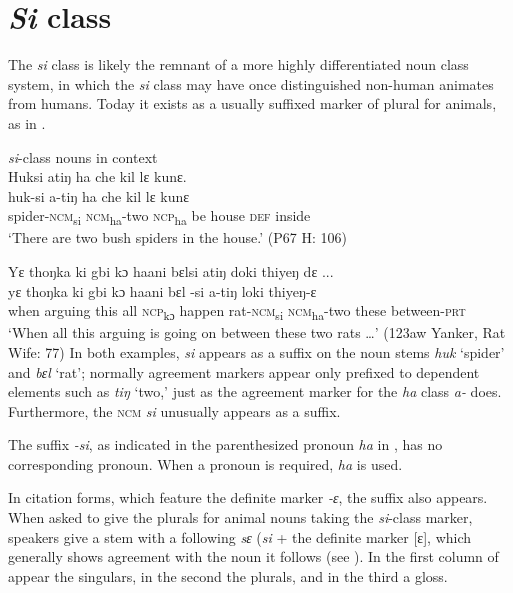 \section{\textit{Si} class}
\hypertarget{Toc115517792}{}\label{sec:5.5}
The \textit{si} class is likely the remnant of a more highly differentiated noun class system, in which the \textit{si} class may have once distinguished non-human animates from humans. Today it exists as a usually suffixed marker of plural for animals, as in .

\ea%
    \label{ex:144}
    \textit{si}{}-class nouns in context\\
    \ea Huksi atiŋ ha che kil lɛ kunɛ.\\
    \gll huk-si      a-tiŋ      ha      che  kil      lɛ    kunɛ\\
    spider-\textsc{ncm}\textsubscript{si}  \textsc{ncm}\textsubscript{ha}{}-two  \textsc{ncp}\textsubscript{ha}    be    house    \textsc{def}  inside\\
    \glt ‘There are two bush spiders in the house.' (P67 H: 106)

    \ex Yɛ thoŋka ki gbi kɔ haani bɛlsi atiŋ   doki thiyeŋ dɛ ...\\
    \gll yɛ    thoŋka  ki    gbi  kɔ    haani    bɛl  {}-si      a-tiŋ      loki  thiyeŋ-ɛ\\
    when  arguing  this  all    \textsc{ncp}\textsubscript{kɔ}  happen  rat-\textsc{ncm}\textsubscript{si}  \textsc{ncm}\textsubscript{ha}{}-two  these  between-\textsc{prt}\\
    \glt ‘When all this arguing is going on between these two rats …' (123aw Yanker, Rat Wife: 77)
\z
\z
In both examples, \textit{si} appears as a suffix on the noun stems \textit{huk} ‘spider' and \textit{bɛl} ‘rat'; normally agreement markers appear only prefixed to dependent elements such as \textit{tiŋ} ‘two,' just as the agreement marker for the \textit{ha} class \textit{a-} does. Furthermore, the \textsc{ncm} \textit{si} unusually appears as a suffix.

The suffix \textit{{}-si}, as indicated in the parenthesized pronoun \textit{ha} in , has no corresponding pronoun. When a pronoun is required, \textit{ha} is used.

In citation forms, which feature the definite marker \textit{{}-ɛ}, the suffix also appears. When asked to give the plurals for animal nouns taking the \textit{si}{}-class marker, speakers give a stem with a following \textit{sɛ} (\textit{si} + the definite marker [ɛ], which generally shows agreement with the noun it follows (see ). In the first column of  appear the singulars, in the second the plurals, and in the third a gloss.

